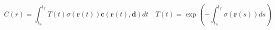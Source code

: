 \begin{equation}
    C(r) = \int_{t_n}^{t_f}T(t)\sigma(\pmb{r}(t))\pmb{c}(\pmb{r}(t), \pmb{d})dt \quad T(t) = \exp{\left(-\int_{t_n}^{t_f}\sigma(\pmb{r}(s))ds\right)}
    \label{eq:volume-rendering}
\end{equation}